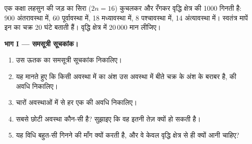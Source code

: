 \begin{problem}
\label{pb:g11:cell-cycle-mitosis:1}
एक कक्षा लहसुन की जड़ का सिरा ($2n = 16$) कुचलकर और रँगकर वृद्धि क्षेत्र
की 1000  गिनती है: 900 अंतरावस्था में, 60 पूर्वावस्था में, 18
मध्यावस्था में, 8 पश्चावस्था में, 14 अंत्यावस्था में। स्वतंत्र मापें इन
 का चक्र 20 घंटे बताती हैं। वृद्धि क्षेत्र में 20\,000 
मान लीजिए।

\medskip
\noindent\textbf{भाग I --- समसूत्री सूचकांक।}
\begin{enumerate}
  \item उस ऊतक का समसूत्री सूचकांक निकालिए।
  \item यह मानते हुए कि किसी अवस्था में  का अंश उस अवस्था में
        बीते चक्र के अंश के बराबर है,  की अवधि निकालिए।
  \item चारों अवस्थाओं में से हर एक की अवधि निकालिए।
  \item सबसे छोटी अवस्था कौन-सी है? सुझाइए कि वह इतनी तेज़ क्यों हो सकती
        है।
  \item यह विधि बहुत-सी  गिनने की माँग क्यों करती है, और वे केवल
        वृद्धि क्षेत्र से ही क्यों आनी चाहिए?
\end{enumerate}


\end{problem}
